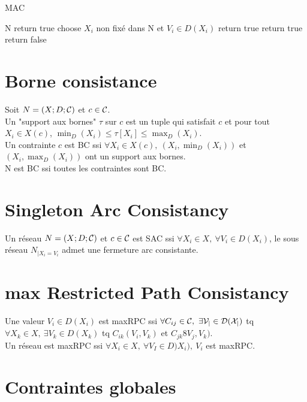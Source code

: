 \documentclass[a4paper,)11pt]{article}
\begin{document}
\begin{algorithm}[H]
\caption{MAC}
\label{MAC}
\begin{algorithmic}
\REQUIRE N
\STATE return true
\ENDIF
\STATE choose $X_i$ non fixé dans N et $V_i \in D(X_i)$
\STATE return true
\ENDIF
{}
\STATE return true
\ENDIF
\ENDIF
\STATE return false
\end{algorithmic}
\end{algorithm}

\section*{Borne consistance}

Soit $N=(X;D;\cal{C})$ et $c \in \cal{C}$.\\
Un "support aux bornes" $\tau$ sur $c$ est un tuple qui satisfait $c$ et pour tout $X_i \in X(c)$, $\min_D (X_i) \le \tau [X_i] \le \max_D (X_i)$.\\
Un contrainte $c$ est BC ssi $\forall X_i \in X(c),\ (X_i,\min_D(X_i))$ et $(X_i, \max_D(X_i))$ ont un support aux bornes.\\
N est BC ssi toutes les contraintes sont BC.

\section*{Singleton Arc Consistancy}
Un réseau $N=(X;D;\cal{C})$ et $c \in \cal{C}$ est SAC ssi $\forall X_i \in X,\ \forall V_i \in D(X_i)$, le sous réseau $N_{|X_i=V_i}$ admet une fermeture arc consistante.\\

\section*{max Restricted Path Consistancy}
Une valeur $V_i \in D(X_i)$ est maxRPC ssi $\forall C_{ij} \in \cal{C},\ \exists V_j \in D(X_j)$ tq $\forall X_k \in X,\ \exists V_k \in D(X_k)$ tq $C_{ik}(V_i,V_k)$ et $C_{jk}8V_j,V_k)$.\\
Un réseau est maxRPC ssi $\forall X_i \in X,\ \forall V_I \in D)X_i),\ V_i$ est maxRPC.

\section*{Contraintes globales}
\end{document}
